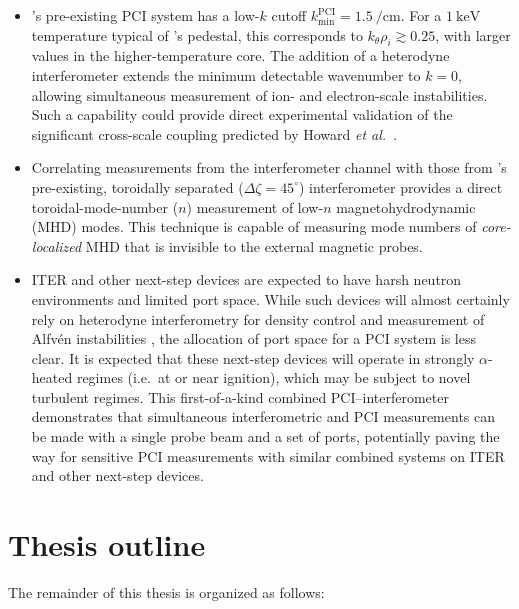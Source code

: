 \begin{itemize}
  \item \diiid's pre-existing PCI system has a low-$k$ cutoff
    $k_{\text{min}}^{\text{PCI}} = \SI{1.5}{\per\centi\meter}$.
    For a $\SI{1}{\kilo\eV}$ temperature typical of \diiid's pedestal,
    this corresponds to $k_{\theta} \rho_i \gtrsim 0.25$,
    with larger values in the higher-temperature core.
    The addition of a heterodyne interferometer
    extends the minimum detectable wavenumber to $k = 0$, allowing
    simultaneous measurement of ion- and electron-scale instabilities.
    Such a capability could provide direct experimental validation
    of the significant cross-scale coupling
    predicted by Howard \emph{et al.}~\cite{howard_pp14,howard_nf16}.
  \item Correlating measurements from the interferometer channel
    with those from \diiid's pre-existing, toroidally separated
    ($\Delta\zeta = 45^{\circ}$) interferometer
    provides a direct toroidal-mode-number ($n$) measurement
    of low-$n$ magnetohydrodynamic (MHD) modes.
    This technique is capable of measuring
    mode numbers of \emph{core-localized} MHD
    that is invisible to the external magnetic probes.
  \item ITER and other next-step devices are expected to have
    harsh neutron environments and limited port space.
    While such devices will almost certainly
    rely on heterodyne interferometry
    for density control and measurement of Alfv\'{e}n instabilities
    \cite{vanzeeland_TIP_rsi13},
    the allocation of port space for a PCI system is less clear.
    It is expected that these next-step devices
    will operate in strongly $\alpha$-heated regimes
    (i.e.\ at or near ignition),
    which may be subject to novel turbulent regimes.
    This first-of-a-kind combined PCI--interferometer
    demonstrates that simultaneous interferometric and PCI measurements
    can be made with a single probe beam and a set of ports,
    potentially paving the way for sensitive PCI measurements
    with similar combined systems on ITER and other next-step devices.
\end{itemize}


\section{Thesis outline}
The remainder of this thesis is organized as follows:

